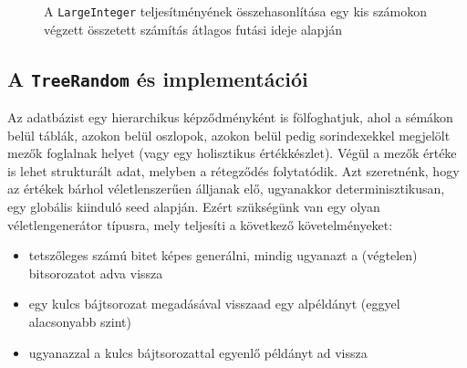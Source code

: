 \documentclass[
    parspace,
    noindent,
    nohyp,
]{elteiktdk}[2023/04/10]
\begin{document}
\begin{figure}[H]
    \centering
    \caption{
        A \texttt{LargeInteger} teljesítményének összehasonlítása
        egy kis számokon végzett összetett számítás átlagos futási ideje alapján
    }
\end{figure}

\subsection{A \texttt{TreeRandom} és implementációi}

Az adatbázist egy hierarchikus képződményként is fölfoghatjuk,
ahol a sémákon belül táblák, azokon belül oszlopok,
azokon belül pedig sorindexekkel megjelölt mezők foglalnak helyet
(vagy egy holisztikus értékkészlet).
Végül a mezők értéke is lehet strukturált adat, melyben a rétegződés folytatódik.
Azt szeretnénk, hogy az értékek bárhol véletlenszerűen álljanak elő,
ugyanakkor determinisztikusan, egy globális kiinduló seed alapján.
Ezért szükségünk van egy olyan véletlengenerátor típusra,
mely teljesíti a következő követelményeket:

\begin{itemize}
    \item tetszőleges számú bitet képes generálni, mindig ugyanazt a (végtelen) bitsorozatot adva vissza
   \item egy kulcs bájtsorozat megadásával visszaad egy alpéldányt (eggyel alacsonyabb szint)
   \item ugyanazzal a kulcs bájtsorozattal egyenlő példányt ad vissza
\end{itemize}
\end{document}

